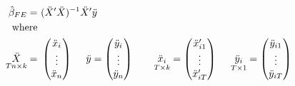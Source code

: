 \documentclass[a4paper,twoside,11pt]{article}
\begin{document}
\begin{equation*}
\begin{aligned}
\hat{\beta}_{FE} =& \  (\ddot X' \ddot X)^{-1} \ddot X' \ddot y \\
\textmd{where} \\
\underset{Tn \times k}{\ddot X} =& \  \begin{pmatrix}
\ddot x_i \\ 
\vdots \\
\ddot x_n 
\end{pmatrix} \ \ \ \ \ddot y = \begin{pmatrix}
\ddot y_i \\ 
\vdots \\
\ddot y_n 
\end{pmatrix} \ \ \ \ \ \ 
\underset{T \times k}{\ddot x_i} = \begin{pmatrix}
\ddot x_{i1}' \\
\vdots \\
\ddot x'_{iT}
\end{pmatrix} \ \ \ \ \underset{T \times 1}{\ddot y_i} = \begin{pmatrix}
\ddot y_{i1} \\
\vdots \\
\ddot y_{iT}
\end{pmatrix}
\end{aligned}
\end{equation*}
\end{document}
